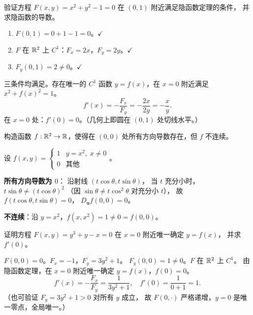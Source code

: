 \documentclass{ctexart}
\begin{document}
\begin{exercise}[验证隐函数定理条件]
  验证方程 $F(x,y) = x^2 + y^2 - 1 = 0$ 在 $(0,1)$ 附近满足隐函数定理的条件，
  并求隐函数的导数。
\end{exercise}

\begin{solution}
  \begin{enumerate}
    \item $F(0,1) = 0 + 1 - 1 = 0$。$\checkmark$
    \item $F$ 在 $\mathbb{R}^2$ 上 $C^1$：$F_x = 2x$，$F_y = 2y$。$\checkmark$
    \item $F_y(0,1) = 2 \ne 0$。$\checkmark$
  \end{enumerate}
  三条件均满足。存在唯一的 $C^1$ 函数 $y = f(x)$，在 $x = 0$ 附近满足 $x^2 + f(x)^2 = 1$。
  \[
    f'(x) = -\frac{F_x}{F_y} = -\frac{2x}{2y} = -\frac{x}{y}.
  \]
  在 $x = 0$ 处：$f'(0) = 0$。（几何上即圆在 $(0,1)$ 处切线水平。）
\end{solution}

\begin{exercise}[综合——反例构造]
  构造函数 $f: \mathbb{R}^2 \to \mathbb{R}$，使得在 $(0,0)$ 处所有方向导数存在，但 $f$ 不连续。
\end{exercise}

\begin{solution}
  设
  $f(x,y) = \begin{cases} 1 & y = x^2,\; x \ne 0 \\ 0 & \text{其他} \end{cases}$。

  \textbf{所有方向导数为 $0$}：
  沿射线 $(t\cos\theta, t\sin\theta)$，
  当 $t$ 充分小时，$t\sin\theta \ne (t\cos\theta)^2$
  （因 $\sin\theta \ne t\cos^2\theta$ 对充分小 $t$），
  故 $f(t\cos\theta, t\sin\theta) = 0$，
  $D_{\mathbf{u}}f(0,0) = 0$。

  \textbf{不连续}：沿 $y = x^2$，$f(x, x^2) = 1 \ne 0 = f(0,0)$。
\end{solution}

\begin{exercise}
  证明方程 $F(x,y) = y^3 + y - x = 0$ 在 $x = 0$ 附近唯一确定 $y = f(x)$，
  并求 $f'(0)$。
\end{exercise}

\begin{solution}
  $F(0,0) = 0$。$F_x = -1$，$F_y = 3y^2 + 1$。
  $F_y(0,0) = 1 \ne 0$。$F$ 在 $\mathbb{R}^2$ 上 $C^1$。
  由隐函数定理，在 $x = 0$ 附近唯一确定 $y = f(x)$，$f(0) = 0$。
  \[
    f'(x) = -\frac{F_x}{F_y} = \frac{1}{3y^2+1}, \quad f'(0) = \frac{1}{0+1} = 1.
  \]
  （也可验证 $F_y = 3y^2 + 1 > 0$ 对所有 $y$ 成立，
  故 $F(0,\cdot)$ 严格递增，$y = 0$ 是唯一零点，全局唯一。）
\end{solution}
\end{document}
